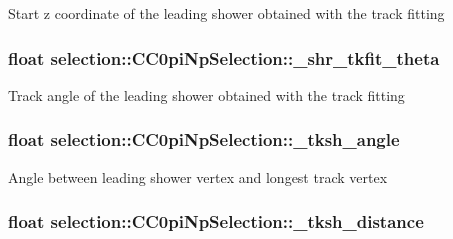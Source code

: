 Start z coordinate of the leading shower obtained with the track fitting \hypertarget{classselection_1_1CC0piNpSelection_a11df391e482434665c389423bbb9ec5d}{
\subsubsection[{\-\_\-shr\-\_\-tkfit\-\_\-theta}]{\setlength{\rightskip}{0pt plus 5cm}float selection\-::\-C\-C0pi\-Np\-Selection\-::\-\_\-shr\-\_\-tkfit\-\_\-theta\hspace{0.3cm}{\ttfamily [private]}}}\label{classselection_1_1CC0piNpSelection_a11df391e482434665c389423bbb9ec5d}
Track angle of the leading shower obtained with the track fitting \hypertarget{classselection_1_1CC0piNpSelection_a959adc6093ff4d2730dac8f75dd1245c}{
\subsubsection[{\-\_\-tksh\-\_\-angle}]{\setlength{\rightskip}{0pt plus 5cm}float selection\-::\-C\-C0pi\-Np\-Selection\-::\-\_\-tksh\-\_\-angle\hspace{0.3cm}{\ttfamily [private]}}}\label{classselection_1_1CC0piNpSelection_a959adc6093ff4d2730dac8f75dd1245c}
Angle between leading shower vertex and longest track vertex \hypertarget{classselection_1_1CC0piNpSelection_a73d772bb569336b56a3f14cee752e2f3}{
\subsubsection[{\-\_\-tksh\-\_\-distance}]{\setlength{\rightskip}{0pt plus 5cm}float selection\-::\-C\-C0pi\-Np\-Selection\-::\-\_\-tksh\-\_\-distance\hspace{0.3cm}{\ttfamily [private]}}}\label{classselection_1_1CC0piNpSelection_a73d772bb569336b56a3f14cee752e2f3}
